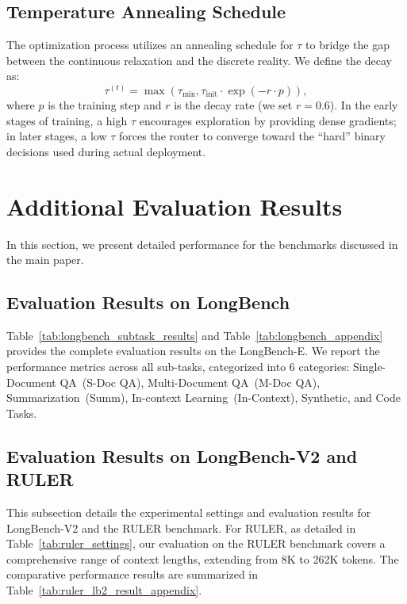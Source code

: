 \subsection{Temperature Annealing Schedule}
\label{appdix:subsec_tau}
The optimization process utilizes an annealing schedule for $\tau$ to bridge the gap between the continuous relaxation and the discrete reality. 
We define the decay as:
\begin{equation}
\tau^{(t)} = \max(\tau_{\text{min}}, \tau_{\text{init}} \cdot \exp(-r \cdot p)),
\end{equation}
where $p$ is the training step and $r$ is the decay rate (we set $r=0.6$). 
In the early stages of training, a high $\tau$ encourages exploration by providing dense gradients; in later stages, a low $\tau$ forces the router to converge toward the ``hard'' binary decisions used during actual deployment.


\section{Additional Evaluation Results}
\label{appdix:eval_res}
In this section, we present detailed performance for the benchmarks discussed in the main paper.

\subsection{Evaluation Results on LongBench}

Table~\ref{tab:longbench_subtask_results} and Table~\ref{tab:longbench_appendix} provides the complete evaluation results on the LongBench-E. 
We report the performance metrics across all sub-tasks, categorized into 6 categories: Single-Document QA~(S-Doc QA), Multi-Document QA~(M-Doc QA), Summarization~(Summ), In-context Learning~(In-Context), Synthetic, and Code Tasks.

\subsection{Evaluation Results on LongBench-V2 and RULER}
This subsection details the experimental settings and evaluation results for LongBench-V2 and the RULER benchmark. 
For RULER, as detailed in Table~\ref{tab:ruler_settings}, our evaluation on the RULER benchmark covers a comprehensive range of context lengths, extending from 8K to 262K tokens. 
The comparative performance results are summarized in Table~\ref{tab:ruler_lb2_result_appendix}.

